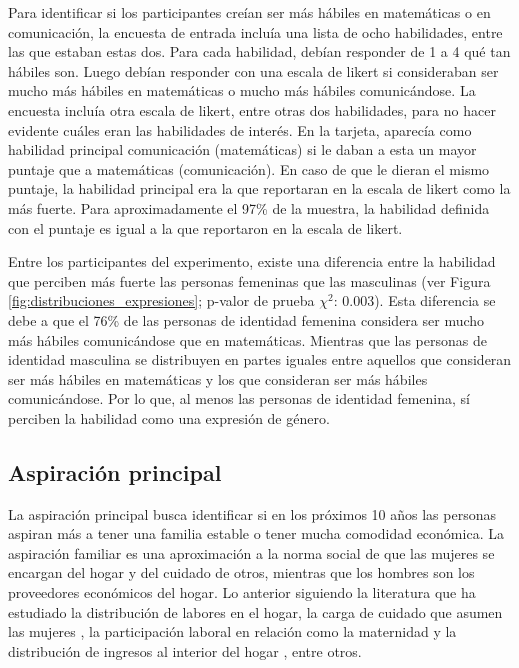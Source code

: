 Para identificar si los participantes creían ser más hábiles en matemáticas o en comunicación, la encuesta de entrada incluía una lista de ocho habilidades, entre las que estaban estas dos. Para cada habilidad, debían responder de 1 a 4 qué tan hábiles son. Luego debían responder con una escala de likert si consideraban ser mucho más hábiles en matemáticas o mucho más hábiles comunicándose. La encuesta incluía otra escala de likert, entre otras dos habilidades, para no hacer evidente cuáles eran las habilidades de interés. En la tarjeta, aparecía como habilidad principal comunicación (matemáticas) si le daban a esta un mayor puntaje que a matemáticas (comunicación). En caso de que le dieran el mismo puntaje, la habilidad principal era la que reportaran en la escala de likert como la más fuerte. Para aproximadamente el 97\% de la muestra, la habilidad definida con el puntaje es igual a la que reportaron en la escala de likert. 

Entre los participantes del experimento, existe una diferencia entre la habilidad que perciben más fuerte las personas femeninas que las masculinas (ver Figura \ref{fig:distribuciones_expresiones}; p-valor de prueba $\chi^2$: 0.003). Esta diferencia se debe a que el 76\% de las personas de identidad femenina considera ser mucho más hábiles comunicándose que en matemáticas. Mientras que las personas de identidad masculina se distribuyen en partes iguales entre aquellos que consideran ser más hábiles en matemáticas y los que consideran ser más hábiles comunicándose. Por lo que, al menos las personas de identidad femenina, sí perciben la habilidad como una expresión de género. 

\subsection{Aspiración principal} 
La aspiración principal busca identificar si en los próximos 10 años las personas aspiran más a tener una familia estable o tener mucha comodidad económica. La aspiración familiar es una aproximación a la norma social de que las mujeres se encargan del hogar y del cuidado de otros, mientras que los hombres son los proveedores económicos del hogar. Lo anterior siguiendo la literatura que ha estudiado la distribución de labores en el hogar, la carga de cuidado que asumen las mujeres \citep{floro1995gendertimeallocation, urdinola2017timeusegender}, la participación laboral en relación como la maternidad \citep{lundborg2017childrencareer}  y la distribución de ingresos al interior del hogar \citep{bertrand2015genderandincome, Robinson2012incomeallocationandshocks}, entre otros. 

